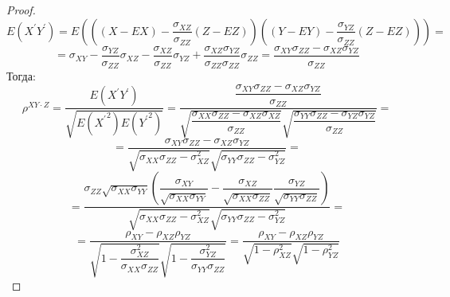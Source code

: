 \begin{proof}
    $$E(X^\prime Y^\prime)=E(((X-EX)-\dfrac{\sigma_{XZ}}{\sigma_{ZZ}}(Z-EZ))((Y-EY)-\dfrac{\sigma_{YZ}}{\sigma_{ZZ}}(Z-EZ)))=$$
    $$=\sigma_{XY}-\dfrac{\sigma_{YZ}}{\sigma_{ZZ}}\sigma_{XZ}-\dfrac{\sigma_{XZ}}{\sigma_{ZZ}}\sigma_{YZ}+
    \dfrac{\sigma_{XZ}\sigma_{YZ}}{\sigma_{ZZ}\sigma_{ZZ}}\sigma_{ZZ}=\dfrac{\sigma_{XY}\sigma_{ZZ}-\sigma_{XZ}\sigma_{YZ}}{\sigma_{ZZ}}$$
    Тогда:
    $$
    \rho^{XY \cdot Z}=\dfrac{E(X^{\prime} Y^{\prime})}{\sqrt{E({X^{\prime}}^2) E({Y^{\prime}}^2)}}=\dfrac{\dfrac{\sigma_{XY}\sigma_{ZZ}-\sigma_{XZ}\sigma_{YZ}}{\sigma_{ZZ}}}
    {\sqrt{
        \dfrac{\sigma_{XX}\sigma_{ZZ}-\sigma_{XZ}\sigma_{XZ}}{\sigma_{ZZ}}
    }\sqrt{
        \dfrac{\sigma_{YY}\sigma_{ZZ}-\sigma_{YZ}\sigma_{YZ}}{\sigma_{ZZ}}
    }}=
    $$
    $$
    =\dfrac{\sigma_{XY} \sigma_{ZZ} - \sigma_{XZ} \sigma_{YZ}}{\sqrt{\sigma_{XX}\sigma_{ZZ}-
    \sigma_{XZ}^2}\sqrt{\sigma_{YY}\sigma_{ZZ}-\sigma_{YZ}^2}}=
    $$
    $$
    =\dfrac{\sigma_{ZZ}\sqrt{\sigma_{XX}\sigma_{YY}}
    \left(\dfrac{\sigma_{XY}}{\sqrt{\sigma_{XX}\sigma_{YY}}} 
    - \dfrac{\sigma_{XZ}}{\sqrt{\sigma_{XX}\sigma_{ZZ}}} \dfrac{\sigma_{YZ}}{\sqrt{\sigma_{YY}\sigma_{ZZ}}}\right)}
    {\sqrt{\sigma_{XX}\sigma_{ZZ}-
    \sigma_{XZ}^2}\sqrt{\sigma_{YY}\sigma_{ZZ}-\sigma_{YZ}^2}}=
    $$
    $$
    =\dfrac{\rho_{XY}-\rho_{XZ}\rho_{YZ}}{\sqrt{1-\dfrac{\sigma_{XZ}^2}{\sigma_{XX}\sigma_{ZZ}}}
    \sqrt{1-\dfrac{\sigma_{YZ}^2}{\sigma_{YY}\sigma_{ZZ}}}}
    =\dfrac{\rho_{XY}-\rho_{XZ}\rho_{YZ}}{\sqrt{1-\rho_{XZ}^2}\sqrt{1-\rho_{YZ}^2}}
    $$
\end{proof}

